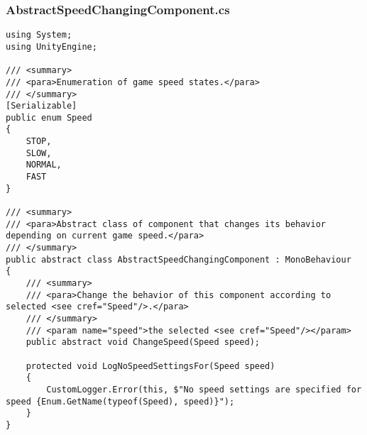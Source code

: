 \subsubsection*{AbstractSpeedChangingComponent.cs}
\begin{verbatim}
using System;
using UnityEngine;

/// <summary>
/// <para>Enumeration of game speed states.</para>
/// </summary>
[Serializable]
public enum Speed
{
    STOP,
    SLOW,
    NORMAL,
    FAST
}

/// <summary>
/// <para>Abstract class of component that changes its behavior depending on current game speed.</para>
/// </summary>
public abstract class AbstractSpeedChangingComponent : MonoBehaviour
{
    /// <summary>
    /// <para>Change the behavior of this component according to selected <see cref="Speed"/>.</para>
    /// </summary>
    /// <param name="speed">the selected <see cref="Speed"/></param>
    public abstract void ChangeSpeed(Speed speed);

    protected void LogNoSpeedSettingsFor(Speed speed)
    {
        CustomLogger.Error(this, $"No speed settings are specified for speed {Enum.GetName(typeof(Speed), speed)}");
    }
}
\end{verbatim}

